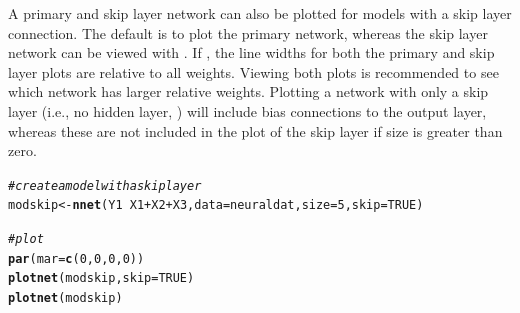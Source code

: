 \documentclass[article,shortnames]{jss}\usepackage[]{graphicx}\usepackage[]{color}
\makeatletter
\newcommand{\hlnum}[1]{\textcolor[rgb]{0.686,0.059,0.569}{#1}}%
\newcommand{\hlcom}[1]{\textcolor[rgb]{0.678,0.584,0.686}{\textit{#1}}}%
\newcommand{\hlopt}[1]{\textcolor[rgb]{0,0,0}{#1}}%
\newcommand{\hlstd}[1]{\textcolor[rgb]{0.345,0.345,0.345}{#1}}%
\newcommand{\hlkwb}[1]{\textcolor[rgb]{0.69,0.353,0.396}{#1}}%
\newcommand{\hlkwc}[1]{\textcolor[rgb]{0.333,0.667,0.333}{#1}}%
\newcommand{\hlkwd}[1]{\textcolor[rgb]{0.737,0.353,0.396}{\textbf{#1}}}%
\newenvironment{kframe}{%
 \def\at@end@of@kframe{}%
 \ifinner\ifhmode%
  \def\at@end@of@kframe{\end{minipage}}%
  \begin{minipage}{\columnwidth}%
 \fi\fi%
 \def\FrameCommand##1{\hskip\@totalleftmargin \hskip-\fboxsep
 \colorbox{shadecolor}{##1}\hskip-\fboxsep
     \hskip-\linewidth \hskip-\@totalleftmargin \hskip\columnwidth}%
 \MakeFramed {\advance\hsize-\width
   \@totalleftmargin\z@ \linewidth\hsize
   \@setminipage}}%
 {\par\unskip\endMakeFramed%
 \at@end@of@kframe}
\newenvironment{knitrout}{}{} %
\makeatother
\begin{document}
A primary and skip layer network can also be plotted for  models with a skip layer connection. The default is to plot the primary network, whereas the skip layer network can be viewed with . If , the line widths for both the primary and skip layer plots are relative to all weights. Viewing both plots is recommended to see which network has larger relative weights. Plotting a network with only a skip layer (i.e., no hidden layer, ) will include bias connections to the output layer, whereas these are not included in the plot of the skip layer if size is greater than zero.

\begin{knitrout}
\color{fgcolor}\begin{kframe}
\begin{alltt}
\hlcom{# create a model with a skip layer}
\hlstd{modskip} \hlkwb{<-} \hlkwd{nnet}\hlstd{(Y1} \hlopt{~} \hlstd{X1} \hlopt{+} \hlstd{X2} \hlopt{+} \hlstd{X3,} \hlkwc{data} \hlstd{= neuraldat,} \hlkwc{size} \hlstd{=} \hlnum{5}\hlstd{,} \hlkwc{skip} \hlstd{=} \hlnum{TRUE}\hlstd{)}

\hlcom{# plot}
\hlkwd{par}\hlstd{(}\hlkwc{mar} \hlstd{=} \hlkwd{c}\hlstd{(}\hlnum{0}\hlstd{,} \hlnum{0}\hlstd{,} \hlnum{0}\hlstd{,} \hlnum{0}\hlstd{))}
\hlkwd{plotnet}\hlstd{(modskip,} \hlkwc{skip} \hlstd{=} \hlnum{TRUE}\hlstd{)}
\hlkwd{plotnet}\hlstd{(modskip)}
\end{alltt}
\end{kframe}\begin{figure}[!ht]


\end{figure}
\end{knitrout}
\end{document}
